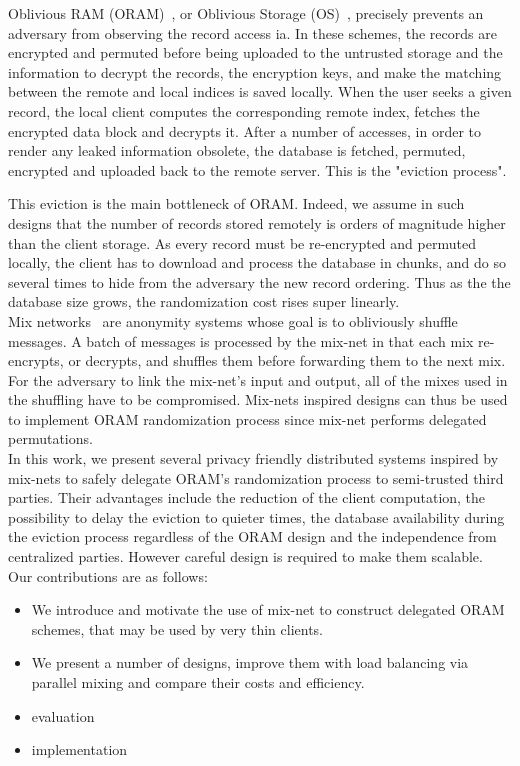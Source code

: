 \documentclass[USenglish,oneside,twocolumn]{article}
\begin{document}
Oblivious RAM (ORAM)~\cite{goldreich87}, or Oblivious Storage (OS)~\cite{boneh2011}, precisely prevents an adversary from observing the record access ia. In these schemes, the records are encrypted and permuted before being uploaded to the untrusted storage and the information to decrypt the records, the encryption keys, and make the matching between the remote and local indices is saved locally. When the user seeks a given record, the local client computes the corresponding remote index, fetches the encrypted data block and decrypts it. After a number of accesses, in order to render any leaked information obsolete, the database is fetched, permuted, encrypted and uploaded back to the remote server. This is the "eviction process".

This eviction is the main bottleneck of ORAM. Indeed, we assume in such designs that the number of records stored remotely is orders of magnitude higher than the client storage. As every record must be re-encrypted and permuted locally, the client has to download and process the database in chunks, and do so several times to hide from the adversary the new record ordering. Thus as the the database size grows, the randomization cost rises super linearly.\\

Mix networks~\cite{chaum1981untraceable} are anonymity systems whose goal is to obliviously shuffle messages. A batch of messages is processed by the mix-net in that each mix re-encrypts, or decrypts, and shuffles them before forwarding them to the next mix. For the adversary to link the mix-net's input and output, all of the mixes used in the shuffling have to be compromised.
Mix-nets inspired designs can thus be used to implement ORAM randomization process since mix-net performs delegated permutations.\\

In this work, we present several privacy friendly distributed systems inspired by mix-nets to safely delegate ORAM's randomization process to semi-trusted third parties.
Their advantages include the reduction of the client computation, the possibility to delay the eviction to quieter times, the database availability during the eviction process regardless of the ORAM design and the independence from centralized parties. However careful design is required to make them scalable.\\

\noindent Our contributions are as follows:
\begin{itemize}
 \item We introduce and motivate the use of mix-net to construct delegated ORAM schemes, that may be used by very thin clients.
 \item We present a number of designs, improve them with load balancing via parallel mixing and compare their costs and efficiency.
 \item evaluation
 \item implementation
\end{itemize}
\end{document}
